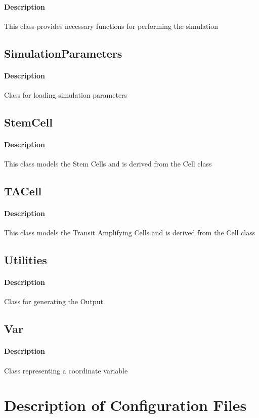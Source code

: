 \documentclass[11pt]{report}
\begin{document}
  \paragraph{Description}
  This class provides necessary functions for performing the simulation
  \subsection{\color{blue}SimulationParameters}
  \paragraph{Description}
  Class for loading simulation parameters
  \subsection{\color{blue}StemCell}
  \paragraph{Description}
  This class models the Stem Cells and is derived from the Cell class
  \subsection{\color{blue}TACell}
  \paragraph{Description}
  This class models the Transit Amplifying Cells and is derived from the Cell class
  \subsection{\color{blue}Utilities}
  \paragraph{Description}
  Class for generating the Output
  \subsection{\color{blue}Var}
  \paragraph{Description}
  Class representing a coordinate variable
  
  \section{\color{red}Description of Configuration Files}
\end{document}
